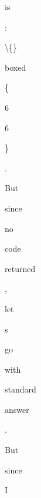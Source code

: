 \begin{figure}[p]
\begin{tcolorbox}
\colorbox{red!54}{\strut\scriptsize  is}\allowbreak\hspace{0pt}%
\colorbox{red!71}{\strut\scriptsize :}\allowbreak\hspace{0pt}%
\colorbox{red!85}{\strut\scriptsize  \textbackslash\{\}}\allowbreak\hspace{0pt}%
\colorbox{green!72}{\strut\scriptsize boxed}\allowbreak\hspace{0pt}%
\colorbox{green!44}{\strut\scriptsize \{}\allowbreak\hspace{0pt}%
\colorbox{green!47}{\strut\scriptsize 6}\allowbreak\hspace{0pt}%
\colorbox{green!46}{\strut\scriptsize 6}\allowbreak\hspace{0pt}%
\colorbox{green!17}{\strut\scriptsize \}}\allowbreak\hspace{0pt}%
\colorbox{red!89}{\strut\scriptsize .  }\allowbreak\hspace{0pt}%
\colorbox{red!45}{\strut\scriptsize But}\allowbreak\hspace{0pt}%
\colorbox{red!88}{\strut\scriptsize  since}\allowbreak\hspace{0pt}%
\colorbox{red!62}{\strut\scriptsize  no}\allowbreak\hspace{0pt}%
\colorbox{red!100}{\strut\scriptsize  code}\allowbreak\hspace{0pt}%
\colorbox{red!100}{\strut\scriptsize  returned}\allowbreak\hspace{0pt}%
\colorbox{red!89}{\strut\scriptsize ,}\allowbreak\hspace{0pt}%
\colorbox{red!56}{\strut\scriptsize  let}\allowbreak\hspace{0pt}%
\colorbox{red!46}{\strut\scriptsize \textquotesingle{}s}\allowbreak\hspace{0pt}%
\colorbox{red!100}{\strut\scriptsize  go}\allowbreak\hspace{0pt}%
\colorbox{red!45}{\strut\scriptsize  with}\allowbreak\hspace{0pt}%
\colorbox{red!100}{\strut\scriptsize  standard}\allowbreak\hspace{0pt}%
\colorbox{red!100}{\strut\scriptsize  answer}\allowbreak\hspace{0pt}%
\colorbox{red!48}{\strut\scriptsize .  }\allowbreak\hspace{0pt}%
\colorbox{red!100}{\strut\scriptsize But}\allowbreak\hspace{0pt}%
\colorbox{red!96}{\strut\scriptsize  since}\allowbreak\hspace{0pt}%
\colorbox{red!86}{\strut\scriptsize  I}\allowbreak\hspace{0pt}%

\end{tcolorbox}
\end{figure}
